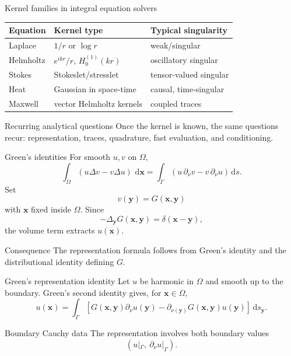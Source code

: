 \documentclass[aspectratio=169,11pt]{beamer}
\newcommand{\dd}{\,\mathrm d}
\newcommand{\x}{\bm{x}}
\newcommand{\y}{\bm{y}}
\begin{document}
\begin{frame}{Kernel families in integral equation solvers}
\small
\begin{center}
\renewcommand{\arraystretch}{1.25}
\begin{tabular}{lll}
\toprule
Equation & Kernel type & Typical singularity \\
\midrule
Laplace & $1/r$ or $\log r$ & weak/singular \\
Helmholtz & $e^{ikr}/r$, $H_0^{(1)}(kr)$ & oscillatory singular \\
Stokes & Stokeslet/stresslet & tensor-valued singular \\
Heat & Gaussian in space-time & causal, time-singular \\
Maxwell & vector Helmholtz kernels & coupled traces \\
\bottomrule
\end{tabular}
\end{center}

\begin{block}{Recurring analytical questions}
Once the kernel is known, the same questions recur: representation, traces,
quadrature, fast evaluation, and conditioning.
\end{block}
\end{frame}

\begin{frame}{Green's identities}
\small
For smooth $u,v$ on $\Omega$,
\[
\int_\Omega (u\Delta v-v\Delta u)\,\dd\x
=
\int_\Gamma
\left(u\,\partial_\nu v-v\,\partial_\nu u\right)\dd s.
\]
Set
\[
v(\y)=G(\x,\y)
\]
with $\x$ fixed inside $\Omega$. Since
\[
-\Delta_{\y} G(\x,\y)=\delta(\x-\y),
\]
the volume term extracts $u(\x)$.

\begin{block}{Consequence}
The representation formula follows from Green's identity and the distributional
identity defining $G$.
\end{block}
\end{frame}

\begin{frame}{Green's representation identity}
\small
Let $u$ be harmonic in $\Omega$ and smooth up to the boundary.
Green's second identity gives, for $\x\in\Omega$,
\[
  u(\x)=
  \int_{\Gamma}
  \left[
  G(\x,\y)\partial_{\nu}u(\y)
  -\partial_{\nu(\y)}G(\x,\y)u(\y)
  \right]\dd s_{\y}.
\]

\begin{block}{Boundary Cauchy data}
The representation involves both boundary values
\[
  \left(u|_\Gamma,\ \partial_\nu u|_\Gamma\right).
\]
\end{block}
\end{frame}
\end{document}
